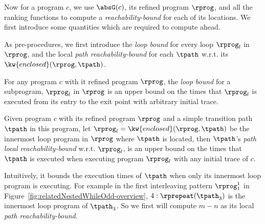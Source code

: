 
Now for a program $c$, we use $\absG(c)$, its refined program $\rprog$, and all the ranking functions to compute a \emph{reachability-bound} for each of its locations.
We first introduce some quantities which are required to compute ahead.

As pre-procedures, we first introduce the \emph{loop bound} for every loop $\rprog_l$ in $\rprog$, and the local \emph{path reachability-bound} for each $\tpath$ w.r.t. its $\kw{enclosed}(\rprog, \tpath)$.
\begin{defn}
 For any program $c$ with it refined program $\rprog$,
 the \emph{loop bound}
 for a subprogram, $\rprog_l$ in $\rprog$ is an upper bound on the times that $\rprog_l$ is executed from its entry to the exit point with arbitrary initial trace.
\end{defn}
% 
\begin{defn}
 Given program $c$ with its refined program $\rprog$ and a simple transition path $\tpath$ in this program, 
 let $\rprog_l = \kw{enclosed}(\rprog, \tpath)$ be the innermost loop program in $\rprog$ where $\tpath$ is located,
 then $\tpath$'s \emph{path local reachability-bound} w.r.t. $\rprog_l$, 
 is an upper bound on the times that $\tpath$ is executed when executing program $\rprog_l$ with any initial trace of $c$.
\end{defn}
Intuitively, it bounds the execution times of $\tpath$ when only its innermost loop program is executing.
For example in the first interleaving pattern $\rprog_1^1$ in Figure~\ref{fig:relatedNestedWhileOdd-overview}, 
$4:\rprepeat(\tpath_3)$ is the innermost loop program of $\tpath_3$.
So we first will compute $m - n$ as its local \emph{path reachability-bound}.

